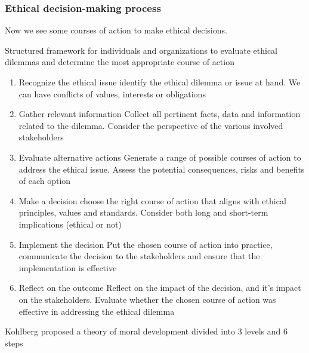\subsubsection{Ethical decision-making process}


Now we see some courses of action to make ethical decisions.

\vspace{10pt}

Structured framework for individuals and organizations to evaluate ethical dilemmas and determine the most appropriate course of action

\begin{enumerate}
    \item Recognize the ethical issue \ra identify the ethical dilemma or issue at hand. We can have conflicts of values, interests or obligations
    \item Gather relevant information \ra Collect all pertinent facts, data and information related to the dilemma. Consider the perspective of the various involved stakeholders
    \item Evaluate alternative actions \ra Generate a range of possible courses of action to address the ethical issue. Assess the potential consequences, risks and benefits of each option
    \item Make a decision \ra choose the right course of action that aligns with ethical principles, values and standards. Consider both long and short-term implications (ethical or not)
    \item Implement the decision \ra Put the chosen course of action into practice, communicate the decision to the stakeholders and ensure that the implementation is effective
    \item Reflect on the outcome \ra Reflect on the impact of the decision, and it's impact on the stakeholders. Evaluate whether the chosen course of action was effective in addressing the ethical dilemma
\end{enumerate}

Kohlberg proposed a theory of moral development divided into 3 levels and 6 steps

